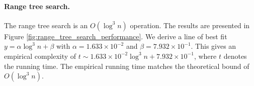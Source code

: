 \documentclass{article}
\newcommand{\figref}[1]{Figure \ref{#1}}
\begin{document}
\begin{figure}[h!]
    \begin{floatrow}
    \end{floatrow}
\end{figure}

\paragraph{Range tree search.} The range tree search is an $O(\log^3 n)$ operation. The results are presented in \figref{fig:range_tree_search_performance}. We derive a line of best fit $y = \alpha \log^3 n + \beta$ with $\alpha = 1.633 \times 10^{-2}$ and $\beta = 7.932 \times 10^{-1}$. This gives an empirical complexity of $t \sim 1.633 \times 10^{-2} \log^3 n + 7.932 \times 10^{-1}$, where $t$ denotes the running time. The empirical running time matches the theoretical bound of $O(\log^3 n)$.
\end{document}
